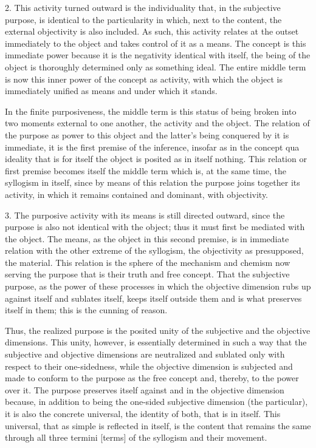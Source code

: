 2. This activity turned outward is the individuality that,
in the subjective purpose, is identical to the particularity
in which, next to the content, the external objectivity is also included.
As such, this activity relates at the outset immediately to the object and
takes control of it as a means.
The concept is this immediate power because it is
the negativity identical with itself,
the being of the object is thoroughly determined only as something ideal.
The entire middle term is now this inner power of the concept as activity,
with which the object is immediately unified as means and under which it stands.

In the finite purposiveness, the middle term is this status of
being broken into two moments external to one another,
the activity and the object.
The relation of the purpose as power to this object and
the latter's being conquered by it is immediate,
it is the first premise of the inference,
insofar as in the concept qua ideality that is for itself
the object is posited as in itself nothing.
This relation or first premise becomes itself the middle term
which is, at the same time, the syllogism in itself,
since by means of this relation the purpose joins together its activity,
in which it remains contained and dominant, with objectivity.

3. The purposive activity with its means is still directed outward,
since the purpose is also not identical with the object;
thus it must first be mediated with the object.
The means, as the object in this second premise, is in
immediate relation with the other extreme of the syllogism,
the objectivity as presupposed, the material.
This relation is the sphere of the mechanism and chemism
now serving the purpose that is their truth and free concept.
That the subjective purpose, as the power of these processes in which the
objective dimension rubs up against itself and sublates itself,
keeps itself outside them and is what preserves itself in them;
this is the cunning of reason.

Thus, the realized purpose is the posited unity of
the subjective and the objective dimensions.
This unity, however, is essentially determined in such a way that
the subjective and objective dimensions are neutralized
and sublated only with respect to their one-sidedness,
while the objective dimension is subjected and made to conform
to the purpose as the free concept and, thereby, to the power over it.
The purpose preserves itself against and in the objective dimension
because, in addition to being the one-sided subjective dimension (the particular),
it is also the concrete universal, the identity of both, that is in itself.
This universal, that as simple is reflected in itself, is the content that
remains the same through all three termini [terms] of the syllogism and their movement.

